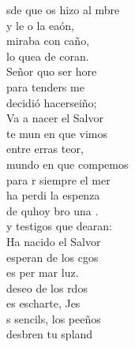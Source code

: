\documentclass[12pt]{article}
\begin{document}
\begin{multicols*}{2}
\begin{cancion}%
	sde que os hizo al mbre\\
	y le o la eaón,\\
	 miraba con caño,\\
	lo quea de coran. \\
	 Señor quo ser hore\\
	para tenders me \\
	decidió hacerseiño;\\
	Va a nacer el Salvor  \\
	te mun en que vimos\\
	entre erras teor,\\
	 mundo en que compemos\\
	para r siempre el mer \\
	 ha perdi la espenza  \\
	de quhoy bro una .\\
	y testigos que dearan:\\
	Ha nacido el Salvor  \\
	 esperan de los cgos\\
	es per mar  luz.\\
	 deseo de los rdos\\
	es escharte, Jes \\
	s sencils, los peeños\\
	desbren tu spland \\

\end{cancion}
\end{multicols*}
\end{document}
